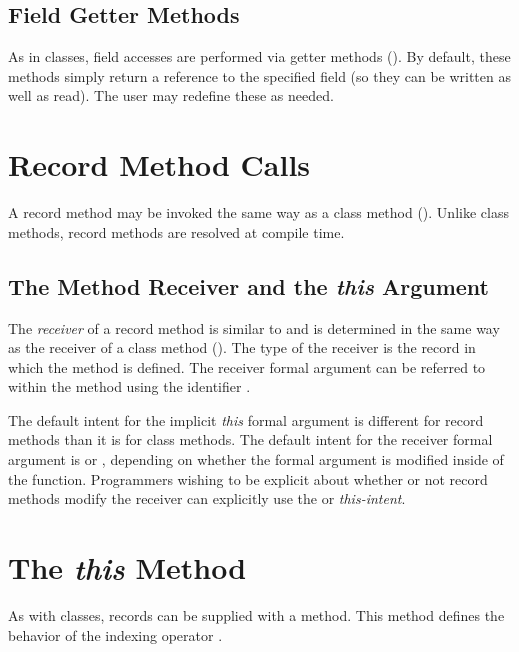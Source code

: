 \subsection{Field Getter Methods}
\label{Field_Getter_Methods}

As in classes, field accesses are performed via getter methods
().  By default, these methods simply return a reference to
the specified field (so they can be written as well as read).  The user may
redefine these as needed.

\section{Record Method Calls}
\label{Record_Method_Access}

A record method may be invoked the same way as a class method
().  Unlike class methods, record methods are
resolved at compile time.  

\subsection{The Method Receiver and the {\em this} Argument}
\label{The_this_Reference}

The \emph{receiver} of a record method is similar to and is determined in the
same way as the receiver of a class method ().
The type of the receiver is the record in which the method is defined.
The receiver formal argument can be referred to within the method
using the identifier .

The default intent for the implicit {\em this} formal argument is
different for record methods than it is for class methods. The default
intent for the receiver formal argument is  or ,
depending on whether the formal argument is modified inside of the
function. Programmers wishing to be explicit about whether or not record
methods modify the receiver can explicitly use the  or
 {\em this-intent}.

\section{The {\em this} Method}

As with classes, records can be supplied with a  method.  This method
defines the behavior of the indexing operator \chpl{[]}.

